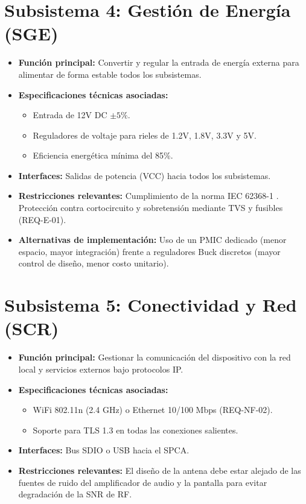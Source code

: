 \documentclass[%
	paper=a4,
	twoside=false,
	parskip=half,
	chapterprefix=false,
	10pt,
	headings=normal,
	bibliography=totoc,
	listof=totoc,
	titlepage=on,
	captions=tableabove,
	draft=false,
]{scrbook}%
\begin{document}
\section{Subsistema 4: Gestión de Energía (SGE)}
\begin{itemize}
    \item \textbf{Función principal:} Convertir y regular la entrada de energía externa para alimentar de forma estable todos los subsistemas.
    \item \textbf{Especificaciones técnicas asociadas:}
        \begin{itemize}
            \item Entrada de 12V DC $\pm 5\%$.
            \item Reguladores de voltaje para rieles de 1.2V, 1.8V, 3.3V y 5V.
            \item Eficiencia energética mínima del 85\%.
        \end{itemize}
    \item \textbf{Interfaces:} Salidas de potencia (VCC) hacia todos los subsistemas.
    \item \textbf{Restricciones relevantes:} Cumplimiento de la norma IEC 62368-1 \cite{iec62368}. Protección contra cortocircuito y sobretensión mediante TVS y fusibles (REQ-E-01).
    \item \textbf{Alternativas de implementación:} Uso de un PMIC dedicado (menor espacio, mayor integración) frente a reguladores Buck discretos (mayor control de diseño, menor costo unitario).
\end{itemize}

\section{Subsistema 5: Conectividad y Red (SCR)}
\begin{itemize}
    \item \textbf{Función principal:} Gestionar la comunicación del dispositivo con la red local y servicios externos bajo protocolos IP.
    \item \textbf{Especificaciones técnicas asociadas:}
        \begin{itemize}
            \item WiFi 802.11n (2.4 GHz) o Ethernet 10/100 Mbps (REQ-NF-02).
            \item Soporte para TLS 1.3 en todas las conexiones salientes.
        \end{itemize}
    \item \textbf{Interfaces:} Bus SDIO o USB hacia el SPCA.
    \item \textbf{Restricciones relevantes:} El diseño de la antena debe estar alejado de las fuentes de ruido del amplificador de audio y la pantalla para evitar degradación de la SNR de RF.
\end{itemize}
\end{document}
